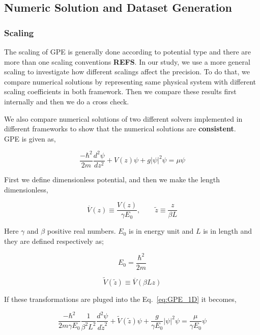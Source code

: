\documentclass[a4paper,times,hidelinks,12pt]{article}
\begin{document}
\subsection{Numeric Solution and Dataset Generation}

\subsubsection{Scaling}

The scaling of GPE is generally done according to potential type and there are more than one scaling conventions \textbf{REFS}. In our study, we use a more general scaling to investigate how different scalings affect the precision. To do that, we compare numerical solutions by representing same physical system with different scaling coefficients in both framework. Then we compare these results first internally and then we do a cross check. 

We also compare numerical solutions of two different solvers implemented in different frameworks to show that the numerical solutions are \textbf{consistent}.\\ 

GPE is given as,

\begin{equation}
    \label{eq:GPE_1D}
    \frac{-\hbar^2}{2m}\frac{d^2\psi}{dz^2} + V(z)\psi + g|\psi|^2\psi = \mu\psi
\end{equation}

First we define dimensionless potential, and then we make the length dimensionless,

$$ \overline{V}(z) \equiv \frac{V(z)}{\gamma E_0}, \qquad \widetilde{z} \equiv \frac{z}{\beta L} $$

Here $\gamma$ and $\beta$ positive real numbers. $E_0$ is in energy unit and $L$ is in length and they are defined respectively as;

$$E_0 = \frac{\hbar^2}{2m} $$


$$ \widetilde{V}(\widetilde{z}) \equiv \overline{V}(\beta L z) $$ 

If these transformations are pluged into the Eq.~\eqref{eq:GPE_1D} it becomes,

\begin{equation}
    \label{eq:GPE_1D_dimensionless_en_len}
    \frac{-\hbar^2}{2m\gamma E_0} \frac{1}{\beta^2 L^2}  \frac{d^2\psi}{d \widetilde{z}^2} + \widetilde{V}(\widetilde{z})\psi + \frac{g}{\gamma E_0}|\psi|^2\psi = \frac{\mu}{\gamma E_0}\psi
\end{equation}
\end{document}
